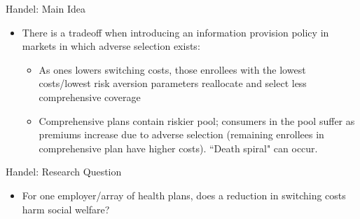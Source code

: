 \begin{frame}{Handel: Main Idea}
\begin{itemize}
\item There is a tradeoff when introducing an information provision policy in markets
in which adverse selection exists:

\begin{itemize}
\item As ones lowers switching costs, those enrollees with the lowest
costs/lowest risk aversion parameters reallocate and select less
comprehensive coverage

\item Comprehensive plans contain riskier pool; consumers in the pool suffer as premiums
increase due to adverse selection (remaining enrollees in comprehensive plan
have higher costs). ``Death spiral" can occur.
\end{itemize}

\end{itemize}
\end{frame}


\begin{frame}{Handel: Research Question}
\begin{itemize}
\item For one employer/array of health plans, does a reduction in switching costs harm
social welfare?
\end{itemize}
\end{frame}


